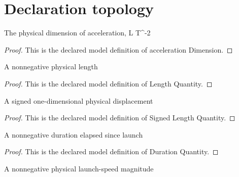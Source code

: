 \section{Declaration topology}
\begin{definition}
  \label{def:physics:phyx-mini-0752:phyxminiproblems-problemphyxmini0752-accelerationdimension}
  The physical dimension of acceleration, L T\textasciicircum{}-2
\end{definition}
\begin{proof}
  This is the declared model definition of acceleration Dimension.
\end{proof}
\begin{definition}
  \label{def:physics:phyx-mini-0752:phyxminiproblems-problemphyxmini0752-lengthquantity}
  A nonnegative physical length
\end{definition}
\begin{proof}
  This is the declared model definition of Length Quantity.
\end{proof}
\begin{definition}
  \label{def:physics:phyx-mini-0752:phyxminiproblems-problemphyxmini0752-signedlengthquantity}
  A signed one-dimensional physical displacement
\end{definition}
\begin{proof}
  This is the declared model definition of Signed Length Quantity.
\end{proof}
\begin{definition}
  \label{def:physics:phyx-mini-0752:phyxminiproblems-problemphyxmini0752-durationquantity}
  A nonnegative duration elapsed since launch
\end{definition}
\begin{proof}
  This is the declared model definition of Duration Quantity.
\end{proof}
\begin{definition}
  \label{def:physics:phyx-mini-0752:phyxminiproblems-problemphyxmini0752-speedquantity}
  A nonnegative physical launch-speed magnitude
\end{definition}
